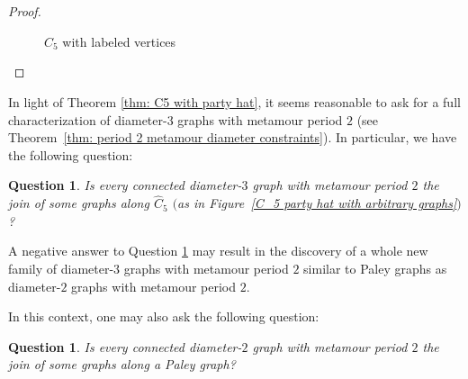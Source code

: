 \documentclass[12pt]{amsart}
\newtheorem{conjecture}[theorem]{Conjecture}
\newtheorem{question}[theorem]{Question}
\theoremstyle{definition}
\theoremstyle{remark}
\numberwithin{equation}{section}
\numberwithin{figure}{section}
\newcommand{\M}{\operatorname{M}}
\begin{document}
\begin{proof}
\begin{figure}[h!]
\begin{center}
        \end{center}
    \caption{$\widehat{C}_5$ with labeled vertices}
    \label{C_5 party hat subgraph}
    \end{figure}
\end{proof}

In light of Theorem \ref{thm: C5 with party hat}, it seems reasonable to ask for a full characterization of diameter-$3$ graphs with metamour period $2$ (see Theorem~\ref{thm: period 2 metamour diameter constraints}). In particular, we have the following question:
\begin{question} \label{q1}
    Is every connected diameter-$3$ graph with metamour period $2$ the join of some graphs along $\widehat{C}_5$ $($as in Figure~\ref{C_5 party hat with arbitrary graphs}$)$?
\end{question}

A negative answer to Question \ref{q1} may result in the discovery of a whole new family of diameter-$3$ graphs with metamour period $2$ similar to Paley graphs as diameter-$2$ graphs with metamour period $2$.

In this context, one may also ask the following question:
\begin{question} \label{q2}
    Is every connected diameter-$2$ graph with metamour period $2$ the join of some graphs along a Paley graph?
\end{question}




\end{document}
